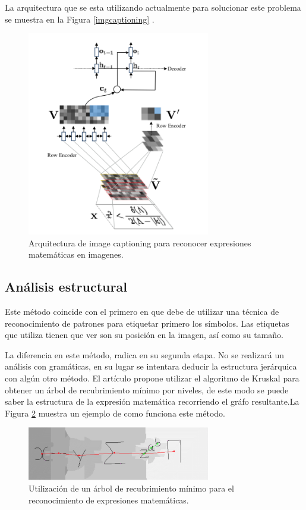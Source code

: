     La arquitectura que se esta utilizando actualmente para solucionar este problema se muestra en la Figura \ref{imgcaptioning} \cite{imagetolatex}\cite{imagemarkup}\cite{chino}.
    
    \begin{figure}
		\centering
		\includegraphics[width=8cm]{capitulo2/images/imgcaptioning}
		\caption{Arquitectura de image captioning para reconocer expresiones matemáticas en imagenes.}
		\label{fig:imgcaptioning}
    \end{figure}

\subsection{Análisis estructural}

Este método coincide con el primero en que debe de utilizar una técnica de reconocimiento de patrones para etiquetar primero los símbolos. Las etiquetas que utiliza tienen que ver son su posición en la imagen, así como su tamaño. 

La diferencia en este método, radica en su segunda etapa. No se realizará un análisis con gramáticas, en su lugar se intentara deducir la estructura jerárquica con algún otro método. El artículo \cite{spanningtree} propone utilizar el algoritmo de Kruskal para obtener un árbol de recubrimiento mínimo por niveles, de este modo se puede saber la estructura de la expresión matemática recorriendo el gráfo resultante.La Figura \ref{fig:spanningtree} muestra un ejemplo de como funciona este método.

\begin{figure}[h]
	\centering
	\includegraphics[width=8cm]{capitulo2/images/spanningtree}
	\caption{Utilización de un árbol de recubrimiento mínimo para el reconocimiento de expresiones matemáticas.}
	\label{fig:spanningtree}
\end{figure}
\newpage
